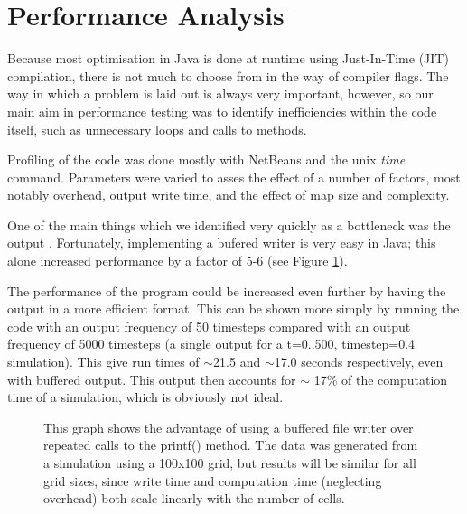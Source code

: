 \section{Performance Analysis} %
   
    Because most optimisation in Java is done at runtime using Just-In-Time (JIT) compilation, there is not much to choose from in the way
  	 of compiler flags. The way in which a problem is laid out is always very important, however, so our main aim in performance testing
 	 was to identify inefficiencies within the code itself, such as unnecessary loops and calls to methods.\newline{}
 	
 	 Profiling of the code was done mostly with NetBeans and the unix \emph{time} command. Parameters were varied to asses the effect of a number of 
 	 factors, most notably overhead, output write time, and the effect of map size and complexity.\newline{}
 
 	 One of the main things which we identified	very quickly as a bottleneck was the output . Fortunately, implementing a bufered writer is
	 very easy in Java; this alone increased performance by a factor of 5-6 (see Figure \ref{buffering}).\newline{}
	 
	The performance of the program could be increased even further by having the output in a more efficient format. This can be shown more 
   simply by running the code with an output frequency of 50 timesteps compared with an output frequency of 5000 timesteps (a single output for a t=0..500, timestep=0.4
   simulation). This give run times of $\sim$21.5 and $\sim$17.0 seconds respectively, even with buffered output. This output then accounts for 
   $\sim$ 17\% of the computation time of a simulation, which is obviously not ideal.  \newline{}

	
  \begin{figure}[H]
  \begin{center}
  
  \caption{\label{buffering}This graph shows the advantage of using a buffered file writer over repeated calls to the printf() method. 
  The data was generated from a simulation using a 100x100 grid, but results will be similar for all grid sizes, since write time and computation
  time (neglecting overhead) both scale linearly with the number of cells.}
  \end{center}
  \end{figure} 

